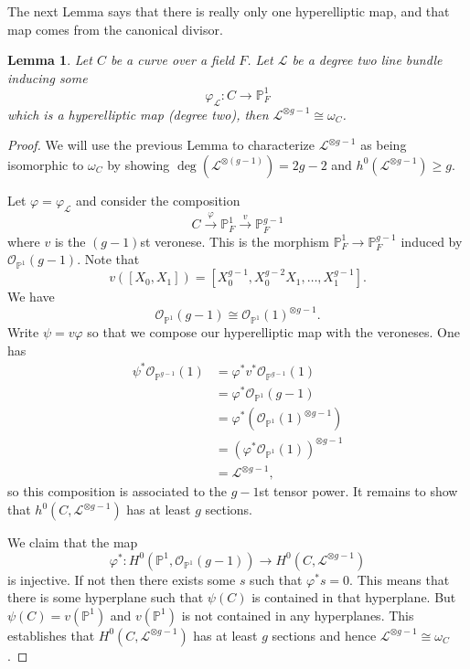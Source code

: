 \documentclass[12pt]{article}
\numberwithin{equation}{section}
\newtheorem{lemma}[theorem]{Lemma}
\theoremstyle{definition}
\theoremstyle{remark}
\newcommand{\Ocal}{\mathcal{O}}
\newcommand{\PP}{\mathbb{P}}
\newcommand{\Lcal}{\mathcal{L}}
\begin{document}
The next Lemma says that there is really only one hyperelliptic map, and that map comes from the canonical divisor. 

\begin{lemma}
	Let $C$ be a curve over a field $F$. 
	Let $\Lcal$ be a degree two line bundle inducing some 
	$$\varphi_{\Lcal}: C\to \PP^1_F$$ 
	which is a hyperelliptic map (degree two), then $\Lcal^{\otimes g-1} \cong \omega_C$.
\end{lemma}
\begin{proof}
	We will use the previous Lemma to characterize $\Lcal^{\otimes g-1}$ as being isomorphic to $\omega_C$ by showing $\deg(\Lcal^{\otimes(g-1)})=2g-2$ and $h^0(\Lcal^{\otimes g-1})\geq g$. 
	
	Let $\varphi = \varphi_{\Lcal}$ and consider the composition
	$$ C \xrightarrow{\varphi} \PP^1_F \xrightarrow{v} \PP^{g-1}_F $$
	where $v$ is the $(g-1)$st veronese. 
	This is the morphism $\PP^1_F\to \PP^{g-1}_F$ induced by $\Ocal_{\PP^1}(g-1)$. 
	Note that 
	$$ v([X_0,X_1]) = [X_0^{g-1}, X_0^{g-2}X_1, \ldots, X_1^{g-1}].$$
	We have 
	$$ \Ocal_{\PP^1}(g-1) \cong \Ocal_{\PP^1}(1)^{\otimes g-1}.$$
	Write $\psi = v\varphi$ so that we compose our hyperelliptic map with the veroneses. 
	One has 
	\begin{align*}
	\psi^* \Ocal_{\PP^{g-1}}(1) &= \varphi^*v^*\Ocal_{\PP^{g-1}}(1) \\
	& = \varphi^* \Ocal_{\PP^1}(g-1) \\
	&= \varphi^*\left( \Ocal_{\PP^1}(1)^{\otimes g-1}\right) \\
	&= (\varphi^*\Ocal_{\PP^1}(1))^{\otimes g-1} \\
	&= \Lcal^{\otimes g-1},
	\end{align*}
	so this composition is associated to the $g-1$st tensor power. 
	It remains to show that $h^0(C,\Lcal^{\otimes g-1})$ has at least $g$ sections.
	
	We claim that the map 
	$$ \varphi^*: H^0(\PP^1,\Ocal_{\PP^1}(g-1)) \to H^0(C,\Lcal^{\otimes g-1}) $$
	is injective. 
	If not then there exists some $s$ such that $\varphi^*s=0$. 
	This means that there is some hyperplane such that $\psi(C)$ is contained in that hyperplane. 
	But $\psi(C)=v(\PP^1)$ and $v(\PP^1)$ is not contained in any hyperplanes.
	This establishes that $H^0(C,\Lcal^{\otimes g-1})$ has at least $g$ sections and hence $\Lcal^{\otimes g-1} \cong \omega_C$.
\end{proof}
\end{document}
